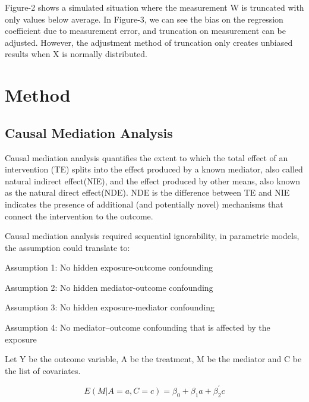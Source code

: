 \documentclass{article}
\begin{document}
Figure-2 shows a simulated situation where the measurement W is truncated with only values below average. In Figure-3, we can see the bias on the regression coefficient due to measurement error, and truncation on measurement can be adjusted. However, the adjustment method of truncation only creates unbiased results when X is normally distributed. 


\pagebreak
\clearpage

\section{Method}

\subsection{Causal Mediation Analysis}

Causal mediation analysis quantifies the extent to which the total effect of an intervention (TE) splits into the effect produced by a known mediator, also called natural indirect effect(NIE), and the effect produced by other means, also known as the natural direct effect(NDE). NDE is the difference between TE and NIE indicates the presence of additional (and potentially novel) mechanisms that connect the intervention to the outcome.\newline

Causal mediation analysis required sequential ignorability, in parametric models, the assumption could translate to:\newline

Assumption 1:  No hidden exposure-outcome confounding\newline

Assumption 2:  No hidden mediator-outcome confounding\newline

Assumption 3: No hidden exposure-mediator confounding\newline

Assumption 4: No mediator–outcome confounding that is affected by the exposure\newline

Let Y be the outcome variable, A be the treatment, M be the mediator and C be the list of covariates.\newline


\begin{equation}
E (M|A = a,C = c) = \beta_0+\beta_1 a+ \beta_2^{'} c
\end{equation}
\end{document}
